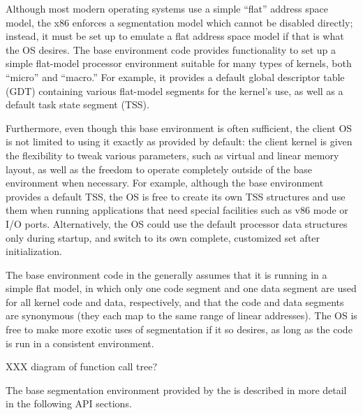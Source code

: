 \label{kern-x86-base-seg}

Although most modern operating systems
use a simple ``flat'' address space model,
the x86 enforces a segmentation model which cannot be disabled directly;
instead, it must be set up to emulate a flat address space model
if that is what the OS desires.
The base environment code provides functionality
to set up a simple flat-model processor environment
suitable for many types of kernels, both ``micro'' and ``macro.''
For example, it provides a default
global descriptor table (GDT)
containing various flat-model segments for the kernel's use,
as well as a default task state segment (TSS).

Furthermore, even though this base environment is often sufficient,
the client OS is not limited to using it exactly as provided by default:
the client kernel is given the flexibility to tweak various parameters,
such as virtual and linear memory layout,
as well as the freedom
to operate completely outside of the base environment when necessary.
For example, although the base environment provides a default TSS,
the OS is free to create its own TSS structures
and use them when running applications that need special facilities
such as v86 mode or I/O ports.
Alternatively, the OS could use the default processor data structures
only during startup,
and switch to its own complete, customized set after initialization.

The base environment code in the \oskit{}
generally assumes that it is running in a simple flat model,
in which only one code segment and one data segment
are used for all kernel code and data, respectively,
and that the code and data segments are synonymous
(they each map to the same range of linear addresses).
The OS is free to make more exotic uses of segmentation if it so desires,
as long as the \oskit{} code is run in a consistent environment.

XXX diagram of function call tree?

The base segmentation environment provided by the \oskit{}
is described in more detail in the following API sections.

